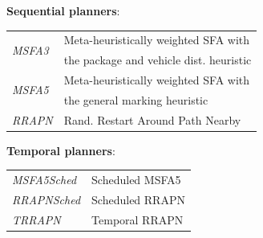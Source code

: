 \documentclass[a1paper,landscape,fontscale=0.45]{baposter} %
\begin{document}
\begin{poster}
{\vspace{0.15cm}
\textbf{Sequential planners}:
\vspace{0.1cm}

{
\setlength{\tabcolsep}{3pt} %
\renewcommand{\arraystretch}{1} %
\begin{tabular}{ll}
\multirow{2}{*}{\textit{MSFA3}} & Meta-heuristically weighted SFA with\\
& the package and vehicle dist. heuristic\\[4pt]
\multirow{2}{*}{\textit{MSFA5}} & Meta-heuristically weighted SFA with\\
& the general marking heuristic\\[4pt]
\textit{RRAPN} & Rand. Restart Around Path Nearby
\end{tabular}

\vspace{0.2cm}
\textbf{Temporal planners}:
\vspace{0.1cm}

{
\setlength{\tabcolsep}{2pt} %
\renewcommand{\arraystretch}{1} %
\begin{tabular}{ll}
\textit{MSFA5Sched} & Scheduled MSFA5\\[2pt]
\textit{RRAPNSched} & Scheduled RRAPN\\[2pt]
\textit{TRRAPN} & Temporal RRAPN
\end{tabular}
}
}
}




\end{poster}
\end{document}
